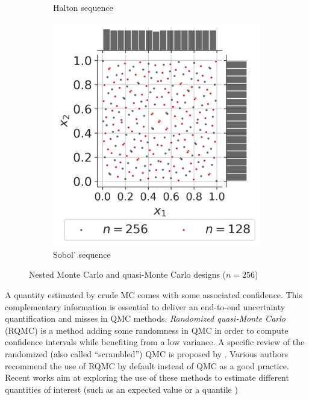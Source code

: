 \begin{figure}[ht]
\begin{subfigure}[b]{0.32\textwidth}
        \caption{Halton sequence}
    \end{subfigure}
    \hfill
    \begin{subfigure}[b]{0.32\textwidth}
        \centering
        \includegraphics[width=\textwidth]{../numerical_experiments/chapter1/figures/quasi_MonteCarlo_256.png}
        \caption{Sobol' sequence}
    \end{subfigure}
       \caption{Nested Monte Carlo and quasi-Monte Carlo designs ($n=256$)}
       \label{fig:quasi_monte_carlo_designs}
\end{figure}

A quantity estimated by crude MC comes with some associated confidence. 
This complementary information is essential to deliver an end-to-end uncertainty quantification and misses in QMC methods.  
\textit{Randomized quasi-Monte Carlo} (RQMC) is a method adding some randomness in QMC in order to compute confidence intervals while benefiting from a low variance.
A specific review of the randomized (also called ``scrambled'') QMC is proposed by \citet{lecuyer_2018}. 
Various authors recommend the use of RQMC by default instead of QMC as a good practice. 
Recent works aim at exploring the use of these methods to estimate different quantities of interest (such as an expected value \citep{gobet_2022} or a quantile \citep{tuffin_2019})

